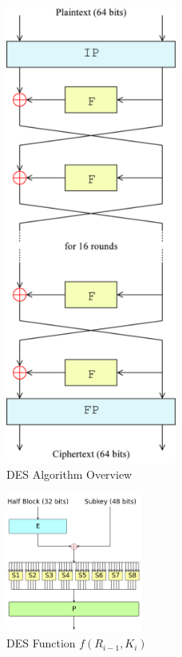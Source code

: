 \begin{figure}[ht]
\begin{center}
\includegraphics[width=0.5\textwidth]{./DESAlgo}
\end{center}
\caption{DES Algorithm Overview}
\end{figure}

\begin{figure}[ht]
\begin{center}
\includegraphics[width=0.4\textwidth]{./FFfunc}
\end{center}
\caption{DES Function $f(R_{i-1},K_i)$}
\end{figure}

